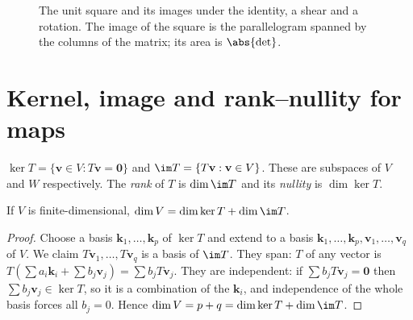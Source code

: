 \begin{figure}[h]
\centering
{}
\caption{The unit square and its images under the identity, a shear and a rotation. The image of the square is the parallelogram spanned by the columns of the matrix; its area is $\abs{\det}$.}
\end{figure}

\section{Kernel, image and rank--nullity for maps}

\begin{definition}
$\ker T=\{\mathbf{v}\in V:T\mathbf{v}=\mathbf{0}\}$ and $\im T=\{T\mathbf{v}:\mathbf{v}\in V\}$. These are subspaces of $V$ and $W$ respectively. The \emph{rank} of $T$ is $\dim\im T$ and its \emph{nullity} is $\dim\ker T$.
\end{definition}

\begin{theorem}\label{thm:ranknullmap}
If $V$ is finite-dimensional, $\dim V=\dim\ker T+\dim\im T$.
\end{theorem}

\begin{proof}
Choose a basis $\mathbf{k}_1,\dots,\mathbf{k}_p$ of $\ker T$ and extend to a basis $\mathbf{k}_1,\dots,\mathbf{k}_p,\mathbf{v}_1,\dots,\mathbf{v}_q$ of $V$. We claim $T\mathbf{v}_1,\dots,T\mathbf{v}_q$ is a basis of $\im T$. They span: $T$ of any vector is $T(\sum a_i\mathbf{k}_i+\sum b_j\mathbf{v}_j)=\sum b_jT\mathbf{v}_j$. They are independent: if $\sum b_jT\mathbf{v}_j=\mathbf{0}$ then $\sum b_j\mathbf{v}_j\in\ker T$, so it is a combination of the $\mathbf{k}_i$, and independence of the whole basis forces all $b_j=0$. Hence $\dim V=p+q=\dim\ker T+\dim\im T$.
\end{proof}

